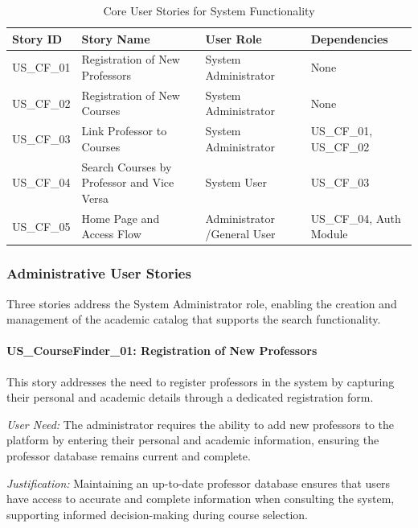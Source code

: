\documentclass[12pt,a4paper]{article}
\begin{document}
\begin{table}[htbp]
	\centering
	\caption{Core User Stories for System Functionality}
	\label{tab:user_stories}
	\begin{tabular}{@{}lp{3cm}p{2.3cm}p{2.5cm}@{}}
		\toprule
		\textbf{Story ID} & \textbf{Story Name} & \textbf{User Role} & \textbf{Dependencies} \\ 
		\midrule
		US\_CF\_01 & Registration of New Professors & System Administrator & None \\
		US\_CF\_02 & Registration of New Courses & System Administrator & None \\
		US\_CF\_03 & Link Professor to Courses & System Administrator & US\_CF\_01, US\_CF\_02 \\
		US\_CF\_04 & Search Courses by Professor and Vice Versa & System User & US\_CF\_03 \\
		US\_CF\_05 & Home Page and Access Flow & Administrator /General User & US\_CF\_04, Auth Module \\
		\bottomrule
	\end{tabular}
\end{table}

\subsubsection{Administrative User Stories}

Three stories address the System Administrator role, enabling the creation and management of the academic catalog that supports the search functionality.

\paragraph{US\_CourseFinder\_01: Registration of New Professors}

This story addresses the need to register professors in the system by capturing their personal and academic details through a dedicated registration form.\newline

\textit{User Need:} The administrator requires the ability to add new professors to the platform by entering their personal and academic information, ensuring the professor database remains current and complete.\newline

\textit{Justification:} Maintaining an up-to-date professor database ensures that users have access to accurate and complete information when consulting the system, supporting informed decision-making during course selection.\newline
\end{document}
